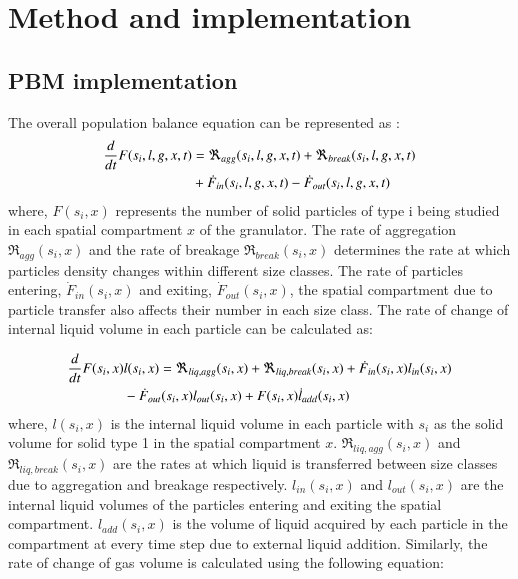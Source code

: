 \documentclass[preprint,10pt,authoryear,review]{elsarticle}
\begin{document}
\section{Method and implementation}
\label{secMethods}
\subsection{PBM implementation}
The overall population balance equation can be represented as \citep{ramkrishna2014}:
\begin{align}
\frac{d}{dt}F(s_i,l,g,x,t)&=\Re_{agg}(s_i,l,g,x,t)+\Re_{break}(s_i,l,g,x,t)\notag\\ 
&+\dot{F}_{in}(s_i,l,g,x,t)-\dot{F}_{out}(s_i,l,g,x,t)
\label{eqn:mthds_pbm_overall} 
\end{align}
where, $F(s_i,x)$ represents the number of solid particles of type i being studied in each spatial 
compartment $x$ of the granulator. The rate of aggregation $\Re_{agg}(s_i,x)$ 
and the rate of breakage $\Re_{break}(s_i,x)$ determines the rate at which particles density
changes within different size classes. The rate of particles entering, $\dot{F}_{in}(s_i,x)$ 
and exiting, $\dot{F}_{out}(s_i,x)$, the spatial compartment due to particle transfer also 
affects their number in each size class. The rate of change of internal liquid volume in each 
particle can be calculated as: 

\begin{align}
\frac{d}{dt}F(s_i,x)&l(s_i,x)= 
\Re_{liq,agg}(s_i,x)+\Re_{liq,break}(s_i,x)+\dot{F}_{in}(s_i,x)l_{in}(s_i,x)\notag\\
&-\dot{F}_{out}(s_i,x)l_{out}(s_i,x)+F(s_i,x)\dot{l}_{add}(s_i,x)
\label{eqn:mthds_pbm_rate} 
\end{align}
where, $l(s_i,x)$ is the internal liquid volume in each particle with ${s_i}$ as the 
solid volume for solid type 1 in the spatial compartment $x$. 
$\Re_{liq,agg}(s_i,x)$ and $\Re_{liq,break}(s_i,x)$ are the rates at which liquid is transferred 
between size classes due to aggregation and breakage respectively. $l_{in}(s_i,x)$ 
and $l_{out}(s_i,x)$ are the internal liquid volumes of the particles entering and exiting 
the spatial compartment. $l_{add}(s_i,x)$ is the volume of liquid acquired 
by each particle in the compartment at every time step due to external liquid addition.
Similarly, the rate of change of gas volume is calculated using the following equation: 
\end{document}
